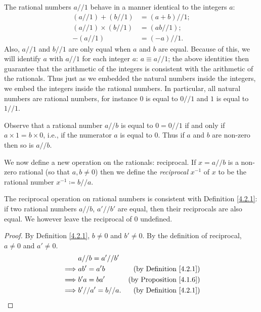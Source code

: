 \begin{note}
    The rational numbers \(a // 1\) behave in a manner identical to the integers \(a\):
    \begin{align*}
        (a // 1) + (b // 1)      & = (a + b) // 1; \\
        (a // 1) \times (b // 1) & = (ab // 1);    \\
        -(a // 1)                & = (-a) // 1.
    \end{align*}
    Also, \(a // 1\) and \(b // 1\) are only equal when \(a\) and \(b\) are equal.
    Because of this, we will identify \(a\) with \(a // 1\) for each integer \(a\): \(a \equiv a // 1\);
    the above identities then guarantee that the arithmetic of the integers is consistent with the arithmetic of the rationals.
    Thus just as we embedded the natural numbers inside the integers, we embed the integers inside the rational numbers.
    In particular, all natural numbers are rational numbers, for instance \(0\) is equal to \(0 // 1\) and \(1\) is equal to \(1 // 1\).
\end{note}

\begin{note}
    Observe that a rational number \(a // b\) is equal to \(0 = 0 // 1\) if and only if \(a \times 1 = b \times 0\), i.e., if the numerator \(a\) is equal to \(0\).
    Thus if \(a\) and \(b\) are non-zero then so is \(a // b\).
\end{note}

\begin{note}
    We now define a new operation on the rationals: reciprocal.
    If \(x = a // b\) is a non-zero rational (so that \(a, b \neq 0\)) then we define the \emph{reciprocal} \(x^{-1}\) of \(x\) to be the rational number \(x^{-1} \coloneqq b // a\).
\end{note}

\begin{additional corollary}\label{ac 4.2.2}
The reciprocal operation on rational numbers is consistent with Definition \ref{4.2.1}:
if two rational numbers \(a // b\), \(a' // b'\) are equal, then their reciprocals are also equal.
We however leave the reciprocal of \(0\) undefined.
\end{additional corollary}

\begin{proof}
    By Definition \ref{4.2.1}, \(b \neq 0\) and \(b' \neq 0\).
    By the definition of reciprocal, \(a \neq 0\) and \(a' \neq 0\).
    \begin{align*}
                 & a // b = a' // b'                                        \\
        \implies & ab' = a'b          & \text{(by Definition \ref{4.2.1})}  \\
        \implies & b'a = ba'          & \text{(by Proposition \ref{4.1.6})} \\
        \implies & b' // a' = b // a. & \text{(by Definition \ref{4.2.1})}
    \end{align*}
\end{proof}

